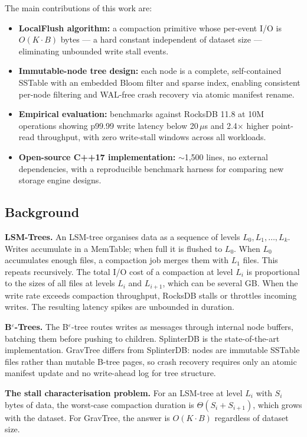 \documentclass{jors}
\begin{document}
The main contributions of this work are:
\begin{itemize}
  \item \textbf{LocalFlush algorithm:} a compaction primitive whose
    per-event I/O is $O(K \cdot B)$ bytes — a hard constant independent
    of dataset size — eliminating unbounded write stall events.
  \item \textbf{Immutable-node tree design:} each node is a complete,
    self-contained SSTable with an embedded Bloom filter and sparse
    index, enabling consistent per-node filtering and WAL-free crash
    recovery via atomic manifest rename.
  \item \textbf{Empirical evaluation:} benchmarks against RocksDB 11.8
    at 10M operations showing p99.99 write latency below 20\,$\mu$s and
    2.4$\times$ higher point-read throughput, with zero write-stall
    windows across all workloads.
  \item \textbf{Open-source C++17 implementation:} $\sim$1,500 lines,
    no external dependencies, with a reproducible benchmark harness for
    comparing new storage engine designs.
\end{itemize}

\subsection*{Background}

\textbf{LSM-Trees.} An LSM-tree organises data as a sequence of levels
$L_0, L_1, \ldots, L_k$. Writes accumulate in a MemTable; when full it
is flushed to $L_0$. When $L_0$ accumulates enough files, a compaction
job merges them with $L_1$ files. This repeats recursively. The total
I/O cost of a compaction at level $L_i$ is proportional to the sizes of
all files at levels $L_i$ and $L_{i+1}$, which can be several GB. When
the write rate exceeds compaction throughput, RocksDB stalls or throttles
incoming writes. The resulting latency spikes are unbounded in duration.

\textbf{B$^\varepsilon$-Trees.} The B$^\varepsilon$-tree
\citep{bender2007cache} routes writes as messages through internal node
buffers, batching them before pushing to children. SplinterDB
\citep{splinterdb} is the state-of-the-art implementation. GravTree
differs from SplinterDB: nodes are immutable SSTable files rather than
mutable B-tree pages, so crash recovery requires only an atomic manifest
update and no write-ahead log for tree structure.

\textbf{The stall characterisation problem.} For an LSM-tree at level
$L_i$ with $S_i$ bytes of data, the worst-case compaction duration is
$\Theta(S_i + S_{i+1})$, which grows with the dataset. For GravTree,
the answer is $O(K \cdot B)$ regardless of dataset size.
\end{document}
